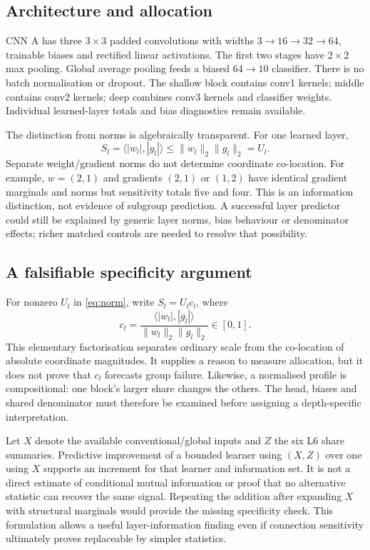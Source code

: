 \documentclass[nolineno]{ieeeaccess}
\begin{document}
\subsection{Architecture and allocation}
CNN A has three $3\times3$ padded convolutions with widths $3\!\rightarrow\!16\!\rightarrow\!32\!\rightarrow\!64$, trainable biases and rectified linear activations. The first two stages have $2\times2$ max pooling. Global average pooling feeds a biased $64\!\rightarrow\!10$ classifier. There is no batch normalisation or dropout. The shallow block contains conv1 kernels; middle contains conv2 kernels; deep combines conv3 kernels and classifier weights. Individual learned-layer totals and bias diagnostics remain available.

The distinction from norms is algebraically transparent. For one learned layer,
\begin{equation}
S_l=\langle|w_l|,|g_l|\rangle
\leq\|w_l\|_2\|g_l\|_2=U_l.
\label{eq:norm}
\end{equation}
Separate weight/gradient norms do not determine coordinate co-location. For example, $w=(2,1)$ and gradients $(2,1)$ or $(1,2)$ have identical gradient marginals and norms but sensitivity totals five and four. This is an information distinction, not evidence of subgroup prediction. A successful layer predictor could still be explained by generic layer norms, bias behaviour or denominator effects; richer matched controls are needed to resolve that possibility.


\subsection{A falsifiable specificity argument}
For nonzero $U_l$ in \eqref{eq:norm}, write $S_l=U_l c_l$, where
\begin{equation}
c_l=\frac{\langle|w_l|,|g_l|\rangle}{\|w_l\|_2\|g_l\|_2}\in[0,1].
\end{equation}
This elementary factorisation separates ordinary scale from the co-location of absolute coordinate magnitudes. It supplies a reason to measure allocation, but it does not prove that $c_l$ forecasts group failure. Likewise, a normalised profile is compositional: one block's larger share changes the others. The head, biases and shared denominator must therefore be examined before assigning a depth-specific interpretation.

Let $X$ denote the available conventional/global inputs and $Z$ the six L6 share summaries. Predictive improvement of a bounded learner using $(X,Z)$ over one using $X$ supports an increment for that learner and information set. It is not a direct estimate of conditional mutual information or proof that no alternative statistic can recover the same signal. Repeating the addition after expanding $X$ with structural marginals would provide the missing specificity check. This formulation allows a useful layer-information finding even if connection sensitivity ultimately proves replaceable by simpler statistics.
\end{document}
